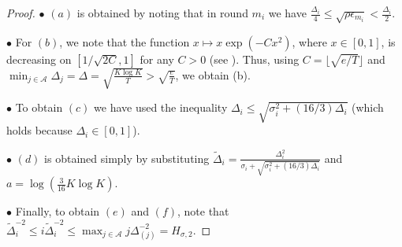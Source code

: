 \begin{proof}
\noindent
 $\bullet$ $(a)$ is obtained by noting that in round $m_i$ we have 
 $\frac{\Delta_i}{4}\leq\sqrt{\rho\epsilon_{m_{i}}}<\frac{\Delta_i}{2}.$

\noindent
 $\bullet$ For $(b)$, we note that the function $x\mapsto x\exp(-Cx^2)$, where $x\in[0,1]$, is  decreasing on $[1/\sqrt{2C},1]$ for any $C>0$ (see \cite{bubeck2011pure,auer2010ucb}). Thus, using $C=\lfloor \sqrt{e/T}\rfloor$ and $\min_{j\in \mathcal{A}}\Delta_j =\Delta =\sqrt{\frac{K\log K}{T}} > \sqrt{\frac{e}{T}}$,
we obtain (b).

\noindent
 $\bullet$
To obtain $(c)$ we have used the inequality $\Delta_i\le \sqrt{\sigma_{i}^{2} + (16/3)\Delta_{i}}$ (which holds because $\Delta_i\in[0,1]$).

\noindent
 $\bullet$
 $(d)$ is obtained simply by substituting $\tilde{\Delta}_i=\frac{\Delta_{i}^{2}}{\sigma_{i}+\sqrt{\sigma_{i}^{2}+(16/3)\Delta_{i}}}$ and $a=\log(\frac{3}{16} K\log K)$.
 
 \noindent
 $\bullet$
 Finally, to obtain $(e)$ and $(f)$, note that 
$\tilde{\Delta}_i^{-2}\le i\tilde{\Delta}_i^{-2} \le \max_{j\in\mathcal{A}}j\Delta_{(j)}^{-2}=H_{\sigma,2}.$
\end{proof}

  

